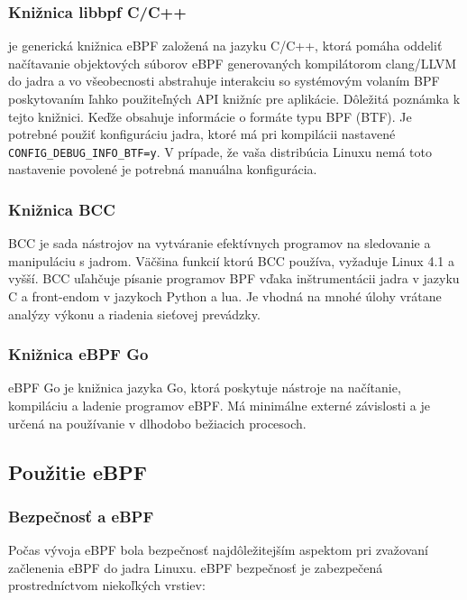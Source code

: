 \subsubsection{Knižnica libbpf C/C++}
je generická knižnica eBPF založená na jazyku C/C++, ktorá pomáha oddeliť načítavanie objektových súborov  eBPF generovaných kompilátorom clang/LLVM do jadra a vo 
všeobecnosti abstrahuje interakciu so systémovým volaním BPF poskytovaním ľahko použiteľných API knižníc pre aplikácie. Dôležitá poznámka k tejto knižnici. 
Keďže obsahuje informácie o formáte typu BPF (BTF). Je potrebné použiť konfiguráciu jadra, ktoré má pri kompilácii nastavené \texttt{CONFIG\_DEBUG\_INFO\_BTF=y}. 
V prípade, že vaša distribúcia Linuxu nemá toto nastavenie povolené je potrebná manuálna konfigurácia.

\subsubsection{Knižnica BCC}
BCC je sada nástrojov na vytváranie efektívnych programov na sledovanie a manipuláciu s jadrom. Väčšina funkcií ktorú BCC používa, vyžaduje Linux 4.1 a vyšší. 
BCC uľahčuje písanie programov BPF vďaka inštrumentácii jadra v jazyku C a front-endom v jazykoch Python a lua. Je vhodná na mnohé úlohy vrátane analýzy výkonu a 
riadenia sieťovej prevádzky.

\subsubsection{Knižnica eBPF Go}
eBPF Go je knižnica jazyka Go, ktorá poskytuje nástroje na načítanie, kompiláciu a ladenie programov eBPF. Má minimálne externé závislosti a je určená na používanie 
v dlhodobo bežiacich procesoch. 

\subsection{Použitie eBPF}
\subsubsection{Bezpečnosť a eBPF}
Počas vývoja eBPF bola bezpečnosť najdôležitejším aspektom pri zvažovaní začlenenia eBPF do jadra Linuxu. 
eBPF bezpečnosť je zabezpečená prostredníctvom niekoľkých vrstiev:

